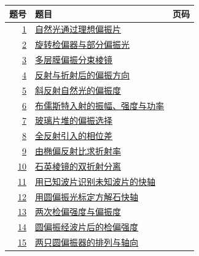 \documentclass[UTF8,fontset=fandol,a4paper,11pt]{ctexart}
\begin{document}
\begin{longtable}{@{}r p{113mm} r@{}}\toprule 题号 & 题目 & 页码\\\midrule

\hyperref[q:1]{1} & \hyperref[q:1]{自然光通过理想偏振片} & \pageref{q:1} \\

\hyperref[q:2]{2} & \hyperref[q:2]{旋转检偏器与部分偏振光} & \pageref{q:2} \\

\hyperref[q:3]{3} & \hyperref[q:3]{多层膜偏振分束棱镜} & \pageref{q:3} \\

\hyperref[q:4]{4} & \hyperref[q:4]{反射与折射后的偏振方向} & \pageref{q:4} \\

\hyperref[q:5]{5} & \hyperref[q:5]{斜反射自然光的偏振度} & \pageref{q:5} \\

\hyperref[q:6]{6} & \hyperref[q:6]{布儒斯特入射的振幅、强度与功率} & \pageref{q:6} \\

\hyperref[q:7]{7} & \hyperref[q:7]{玻璃片堆的偏振选择} & \pageref{q:7} \\

\hyperref[q:8]{8} & \hyperref[q:8]{全反射引入的相位差} & \pageref{q:8} \\

\hyperref[q:9]{9} & \hyperref[q:9]{由椭偏反射比求折射率} & \pageref{q:9} \\

\hyperref[q:10]{10} & \hyperref[q:10]{石英棱镜的双折射分离} & \pageref{q:10} \\

\hyperref[q:11]{11} & \hyperref[q:11]{用已知波片识别未知波片的快轴} & \pageref{q:11} \\

\hyperref[q:12]{12} & \hyperref[q:12]{用圆偏振光标定方解石快轴} & \pageref{q:12} \\

\hyperref[q:13]{13} & \hyperref[q:13]{两次检偏强度与偏振度} & \pageref{q:13} \\

\hyperref[q:14]{14} & \hyperref[q:14]{圆偏振经波片后的检偏强度} & \pageref{q:14} \\

\hyperref[q:15]{15} & \hyperref[q:15]{两只圆偏振器的排列与轴向} & \pageref{q:15} \\


\end{longtable}
\end{document}
